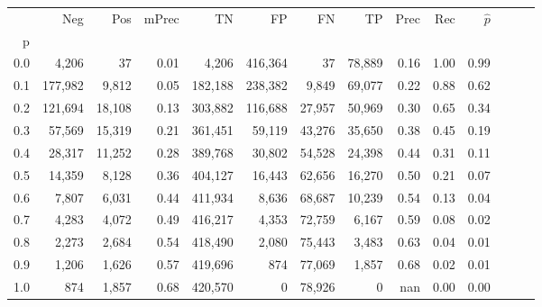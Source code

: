 \begin{tabular}{rrrrrrrrrrrrrr}
\toprule
{} &      Neg &     Pos & mPrec &       TN &       FP &      FN &      TP &  Prec &   Rec & $\hat{p}$ \\
p   &          &         &       &          &          &         &         &       &       &           \\
\midrule
0.0 &    4,206 &      37 &  0.01 &    4,206 &  416,364 &      37 &  78,889 &  0.16 &  1.00 &      0.99 \\
0.1 &  177,982 &   9,812 &  0.05 &  182,188 &  238,382 &   9,849 &  69,077 &  0.22 &  0.88 &      0.62 \\
0.2 &  121,694 &  18,108 &  0.13 &  303,882 &  116,688 &  27,957 &  50,969 &  0.30 &  0.65 &      0.34 \\
0.3 &   57,569 &  15,319 &  0.21 &  361,451 &   59,119 &  43,276 &  35,650 &  0.38 &  0.45 &      0.19 \\
0.4 &   28,317 &  11,252 &  0.28 &  389,768 &   30,802 &  54,528 &  24,398 &  0.44 &  0.31 &      0.11 \\
0.5 &   14,359 &   8,128 &  0.36 &  404,127 &   16,443 &  62,656 &  16,270 &  0.50 &  0.21 &      0.07 \\
0.6 &    7,807 &   6,031 &  0.44 &  411,934 &    8,636 &  68,687 &  10,239 &  0.54 &  0.13 &      0.04 \\
0.7 &    4,283 &   4,072 &  0.49 &  416,217 &    4,353 &  72,759 &   6,167 &  0.59 &  0.08 &      0.02 \\
0.8 &    2,273 &   2,684 &  0.54 &  418,490 &    2,080 &  75,443 &   3,483 &  0.63 &  0.04 &      0.01 \\
0.9 &    1,206 &   1,626 &  0.57 &  419,696 &      874 &  77,069 &   1,857 &  0.68 &  0.02 &      0.01 \\
1.0 &      874 &   1,857 &  0.68 &  420,570 &        0 &  78,926 &       0 &   nan &  0.00 &      0.00 \\
\bottomrule
\end{tabular}
